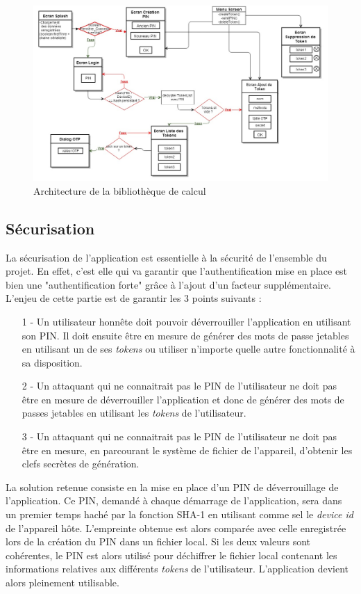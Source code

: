 \begin{figure}
  \centering
  \includegraphics[scale=0.4]{../graphics/archi-android.jpg}
  \caption{Architecture de la bibliothèque de calcul}
  \label{fig:umlLib}
\end{figure}

\newpage
\subsection{Sécurisation}
\label{secu}
La sécurisation de l'application est essentielle à la sécurité de l'ensemble du projet. En
effet, c'est elle qui va garantir que l'authentification mise en place est bien une
"authentification forte" grâce à l'ajout d'un facteur supplémentaire. L'enjeu de cette
partie est de garantir les 3 points suivants :


\begin{itemize}
  \item[1 -] Un utilisateur honnête doit pouvoir déverrouiller l'application en utilisant
  son PIN. Il doit ensuite être en mesure de générer des mots de passe jetables en utilisant
  un de ses \emph{tokens} ou utiliser n'importe quelle autre fonctionnalité à sa
  disposition.
  \item[2 -] Un attaquant qui ne connaitrait pas le PIN de l'utilisateur ne doit pas être en
  mesure de déverrouiller l'application et donc de générer des mots de passes jetables en
  utilisant les \emph{tokens} de l'utilisateur.
  \item[3 -] Un attaquant qui ne connaitrait pas le PIN de l'utilisateur ne doit pas être en
  mesure, en parcourant le système de fichier de l'appareil, d'obtenir les clefs secrètes
  de génération.
\end{itemize}

La solution retenue consiste en la mise en place d'un PIN de déverrouillage de l'application.
Ce PIN, demandé à chaque démarrage de l'application, sera dans un premier temps haché par la
fonction SHA-1 en utilisant comme sel le \emph{device id} de l'appareil hôte. L'empreinte
obtenue est alors comparée avec celle enregistrée lors de la création du PIN dans un fichier
local. Si les deux valeurs sont cohérentes, le PIN est alors utilisé pour déchiffrer le
fichier local contenant les informations relatives aux différents \emph{tokens} de
l'utilisateur. L'application devient alors pleinement utilisable.


